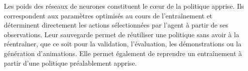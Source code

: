 \noindent Les poids des réseaux de neurones constituent le cœur de la politique apprise. Ils correspondent aux paramètres optimisés au cours de l'entraînement et déterminent directement les actions sélectionnées par l'agent à partir de ses observations. Leur sauvegarde permet de réutiliser une politique sans avoir à la réentraîner, que ce soit pour la validation, l'évaluation, les démonstrations ou la génération d'animations. Elle permet également de reprendre un entraînement à partir d'une politique préalablement apprise.
